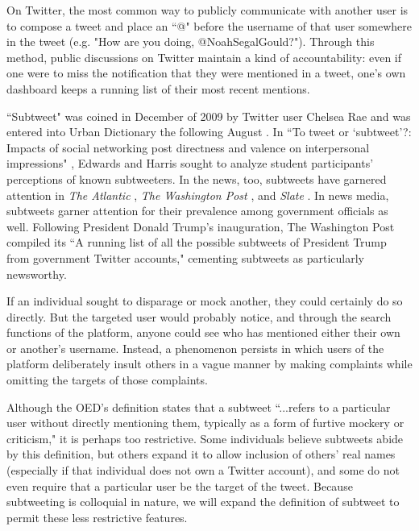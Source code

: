\documentclass[11pt, twoside, reqno]{book}
\begin{document}
On Twitter, the most common way to publicly communicate with another user is to compose a tweet and place an ``@" before the username of that user somewhere in the tweet (e.g. "How are you doing, @NoahSegalGould?"). Through this method, public discussions on Twitter maintain a kind of accountability: even if one were to miss the notification that they were mentioned in a tweet, one's own dashboard keeps a running list of their most recent mentions. 

``Subtweet" was coined in December of 2009 by Twitter user Chelsea Rae \cite{first_subtweet} and was entered into Urban Dictionary the following August \cite{urban_dictionary}. In ``To tweet or ‘subtweet’?: Impacts of social networking post directness and valence on interpersonal impressions" \cite{subtweets_communications}, Edwards and Harris sought to analyze student participants' perceptions of known subtweeters. In the news, too, subtweets have garnered attention in \textit{The Atlantic} \cite{the_atlantic}, \textit{The Washington Post} \cite{the_washington_post}, and \textit{Slate} \cite{slate}. In news media, subtweets garner attention for their prevalence among government officials as well. Following President Donald Trump's inauguration, The Washington Post compiled its ``A running list of all the possible subtweets of President Trump from government Twitter accounts," \cite{the_washington_post_trump} cementing subtweets as particularly newsworthy.

If an individual sought to disparage or mock another, they could certainly do so directly. But the targeted user would probably notice, and through the search functions of the platform, anyone could see who has mentioned either their own or another's username. Instead, a phenomenon persists in which users of the platform deliberately insult others in a vague manner by making complaints while omitting the targets of those complaints. 

Although the OED's definition states that a subtweet ``...refers to a particular user without directly mentioning them, typically as a form of furtive mockery or criticism," it is perhaps too restrictive. Some individuals believe subtweets abide by this definition, but others expand it to allow inclusion of others' real names (especially if that individual does not own a Twitter account), and some do not even require that a particular user be the target of the tweet. Because subtweeting is colloquial in nature, we will expand the definition of subtweet to permit these less restrictive features.
\end{document}
